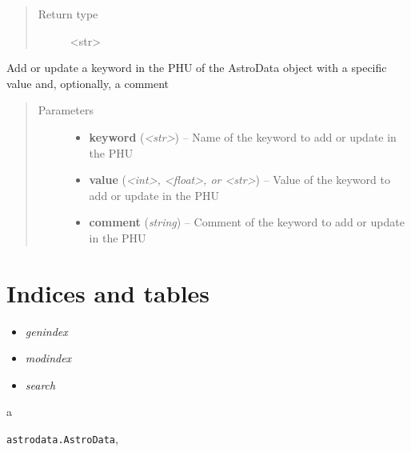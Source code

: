 \documentclass[letterpaper,10pt,english]{sphinxmanual}
\begin{document}
\begin{fulllineitems}
\begin{fulllineitems}
\begin{quote}
\begin{description}
\item[{Return type}] \leavevmode
\textless{}str\textgreater{}

\end{description}\end{quote}

\end{fulllineitems}


\begin{fulllineitems}
\label{astro_class:astrodata.AstroData.AstroData.phu_set_key_value}
Add or update a keyword in the PHU of the AstroData object with a
specific value and, optionally, a comment
\begin{quote}\begin{description}
\item[{Parameters}] \leavevmode\begin{itemize}
\item {} 
\textbf{keyword} (\emph{\textless{}str\textgreater{}}) -- Name of the keyword to add or update in the PHU

\item {} 
\textbf{value} (\emph{\textless{}int\textgreater{}, \textless{}float\textgreater{}, or \textless{}str\textgreater{}}) -- Value of the keyword to add or update in the PHU

\item {} 
\textbf{comment} (\emph{string}) -- Comment of the keyword to add or update in the PHU

\end{itemize}

\end{description}\end{quote}

\end{fulllineitems}


\end{fulllineitems}



\chapter{Indices and tables}
\label{index:indices-and-tables}\begin{itemize}
\item {} 
\emph{genindex}

\item {} 
\emph{modindex}

\item {} 
\emph{search}

\end{itemize}


\renewcommand{\indexname}{Python Module Index}
\begin{theindex}
\def\bigletter#1{{\Large\sffamily#1}\nopagebreak\vspace{1mm}}
\bigletter{a}
\item {\texttt{astrodata.AstroData}}, \pageref{astro_class:module-astrodata.AstroData}
\end{theindex}

\renewcommand{\indexname}{Index}
\printindex
\end{document}
